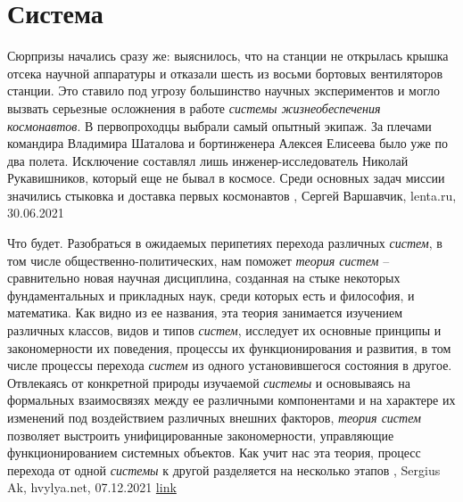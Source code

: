  
 
 
 
 
\chapter{Система}
\label{sec:slova.sistema}

Сюрпризы начались сразу же: выяснилось, что на станции не открылась крышка
отсека научной аппаратуры и отказали шесть из восьми бортовых вентиляторов
станции. Это ставило под угрозу большинство научных экспериментов и могло
вызвать серьезные осложнения в работе \emph{системы жизнеобеспечения
космонавтов}.  В первопроходцы выбрали самый опытный экипаж. За плечами
командира Владимира Шаталова и бортинженера Алексея Елисеева было уже по два
полета. Исключение составлял лишь инженер-исследователь Николай Рукавишников,
который еще не бывал в космосе. Среди основных задач миссии значились стыковка
и доставка первых космонавтов
, Сергей Варшавчик, lenta.ru, 30.06.2021

Что будет. Разобраться в ожидаемых перипетиях перехода различных \emph{систем},
в том числе общественно-политических, нам поможет \emph{теория систем} –
сравнительно новая научная дисциплина, созданная на стыке некоторых
фундаментальных и прикладных наук, среди которых есть и философия, и
математика. Как видно из ее названия, эта теория занимается изучением различных
классов, видов и типов \emph{систем}, исследует их основные принципы и
закономерности их поведения, процессы их функционирования и развития, в том
числе процессы перехода \emph{систем} из одного установившегося состояния в
другое. Отвлекаясь от конкретной природы изучаемой \emph{системы} и основываясь
на формальных взаимосвязях между ее различными компонентами и на характере их
изменений под воздействием различных внешних факторов, \emph{теория систем}
позволяет выстроить унифицированные закономерности, управляющие
функционированием системных объектов.  Как учит нас эта теория, процесс
перехода от одной \emph{системы} к другой разделяется на несколько этапов
, 
Sergius Ak, hvylya.net, 07.12.2021
\href{https://hvylya.net/analytics/243091-ukraina-posle-zelenskogo}{link}
